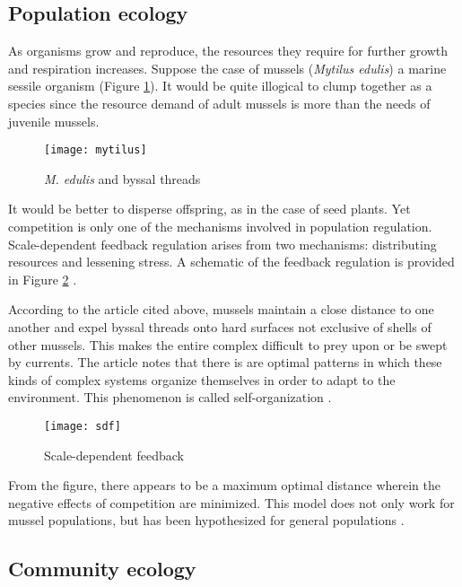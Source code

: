 \subsection{Population ecology}

As organisms grow and reproduce, the resources they require for further growth and respiration increases.
Suppose the case of mussels (\textit{Mytilus edulis}) a marine sessile organism \cite{Seibold2018} (Figure \ref{fig:myt}).
It would be quite illogical to clump together as a species since the resource demand of adult mussels is more than the needs of juvenile mussels.

\begin{figure}
    \centering
    \texttt{[image: mytilus]}
    \caption{\textit{M. edulis} and byssal threads}
    \label{fig:myt}
\end{figure}

It would be better to disperse offspring, as in the case of seed plants.
Yet competition is only one of the mechanisms involved in population regulation.
Scale-dependent feedback regulation arises from two mechanisms: distributing resources and lessening stress.
A schematic of the feedback regulation is provided in Figure \ref{fig:sdf} \cite{Dong2019}.

According to the article cited above, mussels maintain a close distance to one another and expel byssal threads onto hard surfaces not exclusive of shells of other mussels.
This makes the entire complex difficult to prey upon or be swept by currents.
The article notes that there is are optimal patterns in which these kinds of complex systems organize themselves in order to adapt to the environment.
This phenomenon is called self-organization \cite{Dong2019, Veloso2017}.

\begin{figure}[h]
    \centering
    \texttt{[image: sdf]}
    \caption{Scale-dependent feedback}
    \label{fig:sdf}
\end{figure}

From the figure, there appears to be a maximum optimal distance wherein the negative effects of competition are minimized.
This model does not only work for mussel populations, but has been hypothesized for general populations \cite{Dong2019}.

\subsection{Community ecology}

